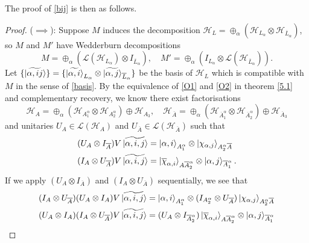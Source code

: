 \documentclass[12pt,a4paper]{report}
\numberwithin{equation}{section}
\newcommand{\ol}[1]{\overline{#1}}
\theoremstyle{definition}
\theoremstyle{theorem}
\theoremstyle{theorem}
\theoremstyle{example}
\theoremstyle{definition}
\begin{document}
The proof of \ref{bij} is then as follows.
\begin{proof}
	($\implies$): Suppose $M$ induces the decomposition $\mathcal{H}_{L}=\oplus_{\alpha}(\mathcal{H}_{L_{\alpha}}\otimes\mathcal{H}_{\ol{L}_{\alpha}})$, so $M$ and $M'$ have Wedderburn decompositions
	\begin{equation}
		M=\oplus_{\alpha}(\mathcal{L}(\mathcal{H}_{L_{\alpha}})\otimes I_{\ol{L}_{\alpha}}),\quad M'=\oplus_{\alpha}(I_{L_{\alpha}}\otimes\mathcal{L}(\mathcal{H}_{\ol{L}_{\alpha}})).
	\end{equation}
	Let $\{\ket{\widetilde{\alpha,ij}}\}=\{\ket{\widetilde{\alpha,i}}_{L_{\alpha}}\otimes\ket{\widetilde{\alpha,j}}_{\ol{L}_{\alpha}}\}$ be the basis of $\mathcal{H}_{L}$ which is compatible with $M$ in the sense of \ref{basis}. By the equivalence of \ref{O1} and \ref{O2} in theorem \ref{5.1} and complementary recovery, we know there exist factorisations
	\begin{equation}
		\mathcal{H}_{A}=\oplus_{\alpha}(\mathcal{H}_{A_{1}^{\alpha}}\otimes\mathcal{H}_{A_{2}^{\alpha}})\oplus\mathcal{H}_{A_{3}},\quad\mathcal{H}_{\ol{A}}=\oplus_{\alpha}(\mathcal{H}_{\ol{A}_{1}^{\alpha}}\otimes\mathcal{H}_{\ol{A}_{2}^{\alpha}})\oplus\mathcal{H}_{\ol{A}_{3}}
	\end{equation}
	and unitaries $U_{A}\in\mathcal{L}(\mathcal{H}_{A})$ and $U_{\ol{A}}\in\mathcal{L}(\mathcal{H}_{\ol{A}})$ such that
	\begin{equation}
		\begin{aligned}
			(U_{A}\otimes I_{\ol{A}})V\ket{\widetilde{\alpha,i,j}}&=\ket{\alpha,i}_{A_{1}^{\alpha}}\otimes\ket{\chi_{\alpha,j}}_{A_{2}^{\alpha}\ol{A}}\\
			(I_{A}\otimes U_{\ol{A}})V\ket{\widetilde{\alpha,i,j}}&=\ket{\ol{\chi}_{\alpha,i}}_{A\ol{A}_{2}^{\alpha}}\otimes\ket{\alpha,j}_{\ol{A}_{1}^{\alpha}}.
		\end{aligned}
	\end{equation}
	If we apply $(U_{A}\otimes I_{\ol{A}})$ and $(I_{A}\otimes U_{\ol{A}})$ sequentially, we see that
	\begin{equation}
		\begin{aligned}
			(I_{A}\otimes U_{\ol{A}})(U_{A}\otimes I_{A})V\ket{\widetilde{\alpha,i,j}}&=\ket{\alpha,i}_{A_{1}^{\alpha}}\otimes(I_{A_{2}^{\alpha}}\otimes U_{\ol{A}})\ket{\chi_{\alpha,j}}_{A_{2}^{\alpha}\ol{A}}\\
			(U_{A}\otimes I_{A})(I_{A}\otimes U_{\ol{A}})V\ket{\widetilde{\alpha,i,j}}&=(U_{A}\otimes I_{\ol{A}_{2}^{\alpha}})\ket{\ol{\chi}_{\alpha,i}}_{A\ol{A}_{2}^{\alpha}}\otimes\ket{\alpha,j}_{\ol{A}_{1}^{\alpha}}

\end{aligned}
\end{equation}
\end{proof}
\end{document}
